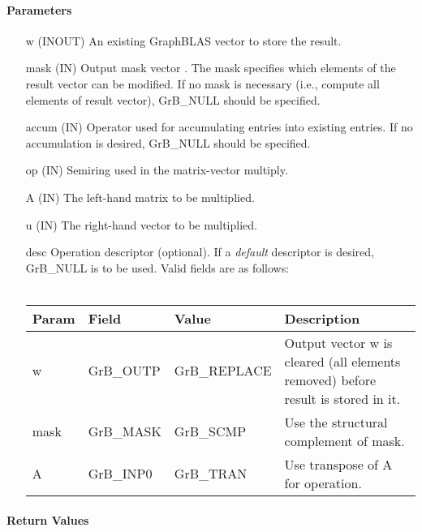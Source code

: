 \paragraph{Parameters}

\begin{itemize}[leftmargin=1.1in]
    \item[{\sf w}]    ({\sf INOUT}) An existing GraphBLAS vector to store the result.
    
    \item[{\sf mask}] ({\sf IN}) Output mask vector . The mask
    specifies which elements of the result vector can be modified.
    If no mask is necessary (i.e., compute all elements of result
    vector), {\sf GrB\_NULL} should be specified.

	\item[{\sf accum}]  ({\sf IN}) Operator used for accumulating entries into existing
                         entries. If no accumulation is desired,
	                    {\sf GrB\_NULL} should be specified.

    \item[{\sf op}]   ({\sf IN}) Semiring used in the matrix-vector multiply.
    \item[{\sf A}]    ({\sf IN}) The left-hand matrix to be multiplied.
    \item[{\sf u}]    ({\sf IN}) The right-hand vector to be multiplied.

    \item[{\sf desc}]  Operation descriptor (optional). If a
    \emph{default} descriptor is desired, {\sf GrB\_NULL} is to be
    used. Valid fields are as follows: \\ ~ \\
    \begin{tabular}{lllp{2.5in}}
    Param & Field  & Value & Description \\
    \hline
    {\sf w}    & {\sf GrB\_OUTP} & {\sf GrB\_REPLACE} & Output vector {\sf w} is cleared (all elements removed) before result is stored in it.\\
    {\sf mask} & {\sf GrB\_MASK} & {\sf GrB\_SCMP}   & Use the structural complement of {\sf mask}. \\
    {\sf A}    & {\sf GrB\_INP0} & {\sf GrB\_TRAN}   & Use transpose of {\sf A} for operation. \\
    \end{tabular}
\end{itemize}

\paragraph{Return Values}

